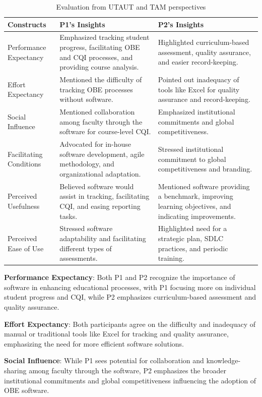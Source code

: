 \documentclass[journal,onecolumn]{IEEEtran}
\begin{document}
\begin{table}[hb]
\centering
\caption{Evaluation from UTAUT and TAM perspectives}
\label{tab:utaut_tam_evaluation}
\begin{tabular}{|p{3cm}|p{6cm}|p{6cm}|}
\hline
\textbf{Constructs} & \textbf{P1's Insights} & \textbf{P2's Insights} \\
\hline
Performance Expectancy & Emphasized tracking student progress, facilitating OBE and CQI processes, and providing course analysis. & Highlighted curriculum-based assessment, quality assurance, and easier record-keeping. \\
\hline
Effort Expectancy & Mentioned the difficulty of tracking OBE processes without software. & Pointed out inadequacy of tools like Excel for quality assurance and record-keeping. \\
\hline
Social Influence & Mentioned collaboration among faculty through the software for course-level CQI. & Emphasized institutional commitments and global competitiveness. \\
\hline
Facilitating Conditions & Advocated for in-house software development, agile methodology, and organizational adaptation. & Stressed institutional commitment to global competitiveness and branding. \\
\hline
Perceived Usefulness & Believed software would assist in tracking, facilitating CQI, and easing reporting tasks. & Mentioned software providing a benchmark, improving learning objectives, and indicating improvements. \\
\hline
Perceived Ease of Use & Stressed software adaptability and facilitating different types of assessments. & Highlighted need for a strategic plan, SDLC practices, and periodic training. \\
\hline
\end{tabular}
\end{table}
\textbf{Performance Expectancy}: Both P1 and P2 recognize the importance of software in enhancing educational processes, with P1 focusing more on individual student progress and CQI, while P2 emphasizes curriculum-based assessment and quality assurance.

\textbf{Effort Expectancy}: Both participants agree on the difficulty and inadequacy of manual or traditional tools like Excel for tracking and quality assurance, emphasizing the need for more efficient software solutions.

\textbf{Social Influence}: While P1 sees potential for collaboration and knowledge-sharing among faculty through the software, P2 emphasizes the broader institutional commitments and global competitiveness influencing the adoption of OBE software.
\end{document}

